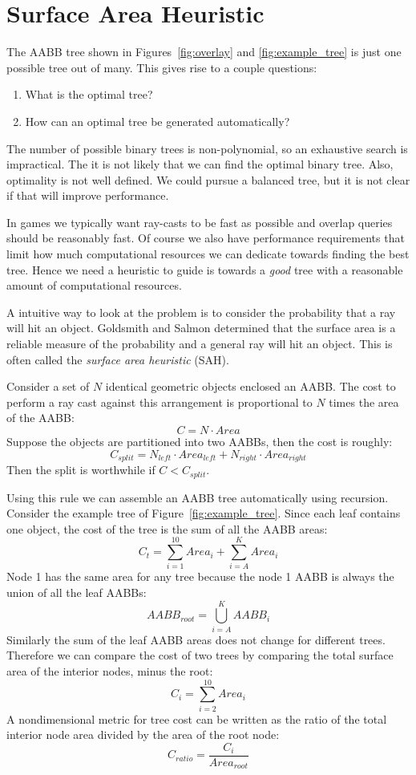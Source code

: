 \documentclass{article}
\begin{document}
\section{Surface Area Heuristic}
The AABB tree shown in Figures~\ref{fig:overlay} and \ref{fig:example_tree} is just one possible tree out of many. This gives rise to a couple questions:
\begin{enumerate}
	\item What is the optimal tree?
	\item How can an optimal tree be generated automatically?
\end{enumerate}
The number of possible binary trees is non-polynomial, so an exhaustive search is impractical. The it is not likely that we can find the optimal binary tree. Also, optimality is not well defined. We could pursue a balanced tree, but it is not clear if that will improve performance.

In games we typically want ray-casts to be fast as possible and overlap queries should be reasonably fast. Of course we also have performance requirements that limit how much computational resources we can dedicate towards finding the best tree. Hence we need a heuristic to guide is towards a \emph{good} tree with a reasonable amount of computational resources.

A intuitive way to look at the problem is to consider the probability that a ray will hit an object. Goldsmith and Salmon determined that the surface area is a reliable measure of the probability and a general ray will hit an object. This is often called the \emph{surface area heuristic} (SAH).

Consider a set of $N$ identical geometric objects enclosed an AABB. The cost to perform a ray cast against this arrangement is proportional to $N$ times the area of the AABB:
\[ C = N \cdot Area \]
Suppose the objects are partitioned into two AABBs, then the cost is roughly:
\[ C_{split} = N_{left} \cdot Area_{left} + N_{right} \cdot Area_{right} \]
Then the split is worthwhile if $C < C_{split}$.

Using this rule we can assemble an AABB tree automatically using recursion. Consider the example tree of Figure~\ref{fig:example_tree}. Since each leaf contains one object, the cost of the tree is the sum of all the AABB areas:
\[ C_t = \sum_{i=1}^{10} Area_i + \sum_{i=A}^K Area_i\]
Node 1 has the same area for any tree because the node 1 AABB is always the union of all the leaf AABBs:
\[ AABB_{root} = \bigcup_{i=A}^K AABB_i \]
Similarly the sum of the leaf AABB areas does not change for different trees. Therefore we can compare the cost of two trees by comparing the total surface area of the interior nodes, minus the root:
\[ C_i = \sum_{i=2}^{10} Area_i \]
A nondimensional metric for tree cost can be written as the ratio of the total interior node area divided by the area of the root node:
\[ C_{ratio} = \frac{C_i}{Area_{root}} \]
\end{document}
